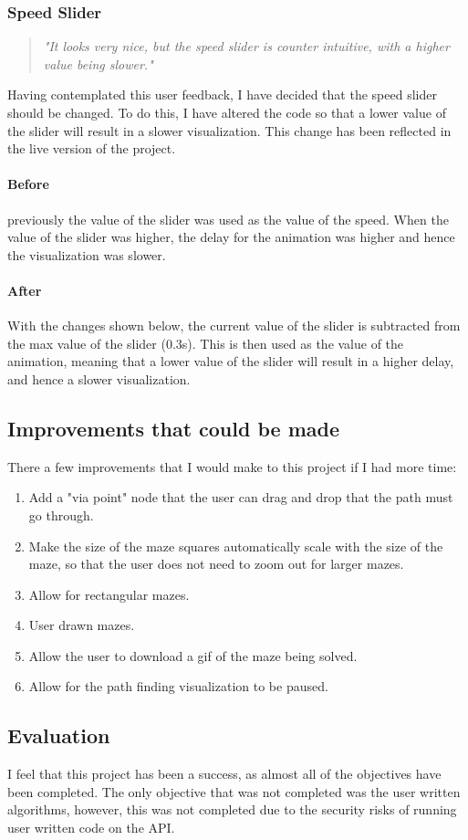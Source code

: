 \documentclass[titlepage]{article}
\begin{document}
\subsubsection{Speed Slider}
\begin{quote}
    \textit{
        "It looks very nice, but the speed slider is counter intuitive, with a higher value being slower."
    }
\end{quote}
Having contemplated this user feedback, I have decided that the speed slider should be changed. To do this, I have altered the code so that a lower value of the slider will result in a slower visualization. This change has been reflected in the live version of the project.
\paragraph*{Before}
previously the value of the slider was used as the value of the speed. When the value of the slider was higher, the delay for the animation was higher and hence the visualization was slower.

\paragraph*{After}
With the changes shown below, the current value of the slider is subtracted from the max value of the slider (0.3s). This is then used as the value of the animation, meaning that a lower value of the slider will result in a higher delay, and hence a slower visualization.

\subsection{Improvements that could be made}
There a few improvements that I would make to this project if I had more time:
\begin{enumerate}
    \item Add a "via point" node that the user can drag and drop that the path must go through.
    \item Make the size of the maze squares automatically scale with the size of the maze, so that the user does not need to zoom out for larger mazes.
    \item Allow for rectangular mazes.
    \item User drawn mazes.
    \item Allow the user to download a gif of the maze being solved.
    \item Allow for the path finding visualization to be paused.
\end{enumerate}

\subsection{Evaluation}
I feel that this project has been a success, as almost all of the objectives have been completed. The only objective that was not completed was the user written algorithms, however, this was not completed due to the security risks of running user written code on the API.
\end{document}
